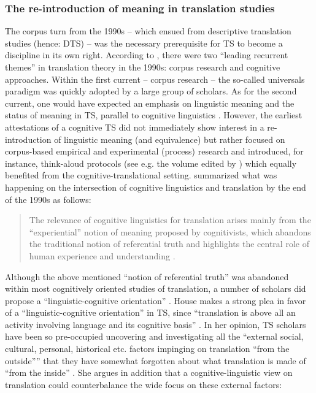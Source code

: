 \subsubsection{The re-introduction of meaning in translation studies}\label{sec:2.2.3.2}  
The corpus turn from the 1990s – which ensued from descriptive translation studies (hence: DTS) – was the necessary prerequisite for TS to become a discipline in its own right. According to \citet[41]{thelen_translation_2002}, there were two “leading recurrent themes” in translation theory in the 1990s: corpus research and cognitive approaches. Within the first current – corpus research – the so-called universals paradigm was quickly adopted by a large group of scholars. As for the second current, one would have expected an emphasis on linguistic meaning and the status of meaning in TS, parallel to cognitive linguistics \citep[41]{thelen_translation_2002}. However, the earliest attestations of a cognitive TS did not immediately show interest in a re-introduction of linguistic meaning (and equivalence) but rather focused on corpus-based empirical and experimental (process) research and introduced, for instance, think-aloud protocols (see e.g. the volume edited by \citealt{tirkkonen-condit_tapping_2000}) which equally benefited from the cognitive-translational setting. \citet{rojo_cognitive_2013} summarized what was happening on the intersection of cognitive linguistics and translation by the end of the 1990s as follows:

\begin{quote}
The relevance of cognitive linguistics for translation arises mainly from the “experiential” notion of meaning proposed by cognitivists, which abandons the traditional notion of referential truth and highlights the central role of human experience and understanding \citep[7]{rojo_cognitive_2013}.
\end{quote}

Although the above mentioned “notion of referential truth” was abandoned within most cognitively oriented studies of translation, a number of scholars did propose a “linguistic-cognitive orientation” \citep{house_towards_2013}. House makes a strong plea in favor of a “linguistic-cognitive orientation” in TS, since “translation is above all an activity involving language and its cognitive basis” \citep[47]{house_towards_2013}. In her opinion, TS scholars have been so pre-occupied uncovering and investigating all the “external social, cultural, personal, historical etc. factors impinging on translation ``from the outside''{”} that they have somewhat forgotten about what translation is made of ``from the inside'' \citep[47]{house_towards_2013}. She argues in addition that a cognitive-linguistic view on translation could counterbalance the wide focus on these external factors:

